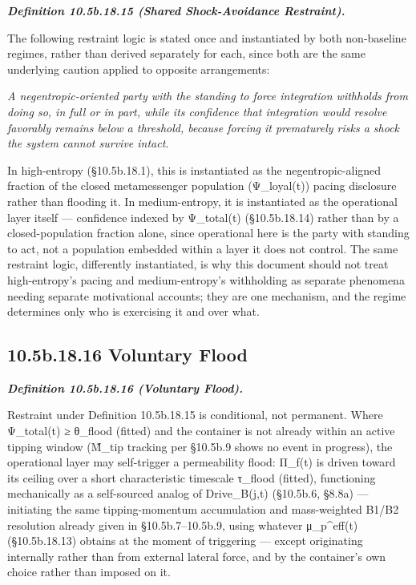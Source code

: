 \documentclass[
]{article}
\begin{document}
\emph{\textbf{Definition 10.5b.18.15 (Shared Shock-Avoidance
Restraint).}}

The following restraint logic is stated once and instantiated by both
non-baseline regimes, rather than derived separately for each, since
both are the same underlying caution applied to opposite arrangements:

\emph{A negentropic-oriented party with the standing to force
integration withholds from doing so, in full or in part, while its
confidence that integration would resolve favorably remains below a
threshold, because forcing it prematurely risks a shock the system
cannot survive intact.}

In high-entropy (§10.5b.18.1), this is instantiated as the
negentropic-aligned fraction of the closed metamessenger population
(Ψ\_loyal(t)) pacing disclosure rather than flooding it. In
medium-entropy, it is instantiated as the operational layer itself ---
confidence indexed by Ψ\_total(t) (§10.5b.18.14) rather than by a
closed-population fraction alone, since operational here is the party
with standing to act, not a population embedded within a layer it does
not control. The same restraint logic, differently instantiated, is why
this document should not treat high-entropy's pacing and
medium-entropy's withholding as separate phenomena needing separate
motivational accounts; they are one mechanism, and the regime determines
only who is exercising it and over what.

\hypertarget{b.18.16-voluntary-flood}{%
\subsection{10.5b.18.16 Voluntary Flood}\label{b.18.16-voluntary-flood}}

\emph{\textbf{Definition 10.5b.18.16 (Voluntary Flood).}}

Restraint under Definition 10.5b.18.15 is conditional, not permanent.
Where Ψ\_total(t) ≥ θ\_flood (fitted) and the container is not already
within an active tipping window (M̃\_tip tracking per §10.5b.9 shows no
event in progress), the operational layer may self-trigger a
permeability flood: Π\_f(t) is driven toward its ceiling over a short
characteristic timescale τ\_flood (fitted), functioning mechanically as
a self-sourced analog of Drive\_B(j,t) (§10.5b.6, §8.8a) --- initiating
the same tipping-momentum accumulation and mass-weighted B1/B2
resolution already given in §10.5b.7--10.5b.9, using whatever
μ\_p\^{}eff(t) (§10.5b.18.13) obtains at the moment of triggering ---
except originating internally rather than from external lateral force,
and by the container's own choice rather than imposed on it.
\end{document}

